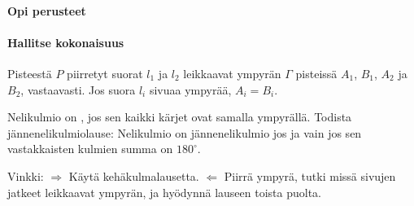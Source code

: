 \begin{tehtavasivu}

\paragraph*{Opi perusteet}

\paragraph*{Hallitse kokonaisuus}

\begin{tehtava}
Pisteestä $P$ piirretyt suorat $l_1$ ja $l_2$ leikkaavat ympyrän $\Gamma$ pisteissä $A_1$, $B_1$, $A_2$ ja $B_2$, vastaavasti. Jos suora $l_{i}$ sivuaa ympyrää, $A_{i} = B_{i}$.
\end{tehtava}

\begin{tehtava}
Nelikulmio on , jos sen kaikki kärjet ovat samalla ympyrällä. Todista jännenelikulmiolause: Nelikulmio on jännenelikulmio jos ja vain jos sen vastakkaisten kulmien summa on $180^{\circ}$.
\begin{vastaus}
Vinkki: $\Rightarrow$ Käytä kehäkulmalausetta. $\Leftarrow$ Piirrä ympyrä, tutki missä sivujen jatkeet leikkaavat ympyrän, ja hyödynnä lauseen toista puolta.
\end{vastaus}
\end{tehtava}

\end{tehtavasivu}
